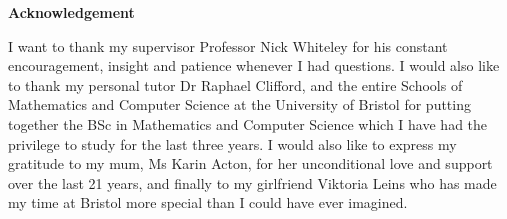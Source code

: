 \thispagestyle{plain}
\mbox{}
\vspace{60mm}
\begin{center}
    \textbf{Acknowledgement}
\end{center}
I want to thank my supervisor Professor Nick Whiteley for his constant encouragement, insight and patience whenever I had questions. I would also like to thank my personal tutor Dr Raphael Clifford, and the entire Schools of Mathematics and Computer Science at the University of Bristol for putting together the BSc in Mathematics and Computer Science which I have had the privilege to study for the last three years.
\newline\newline
I would also like to express my gratitude to my mum, Ms Karin Acton, for her unconditional love and support over the last 21 years, and finally to my girlfriend Viktoria Leins who has made my time at Bristol more special than I could have ever imagined.
\newpage